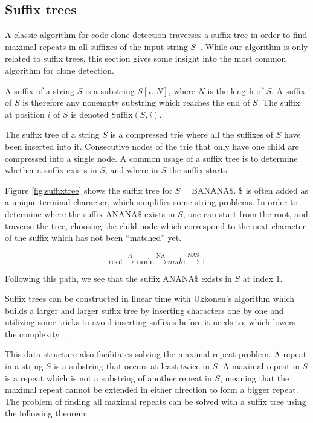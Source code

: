 \subsection*{Suffix trees}

A classic algorithm for code clone detection traverses a suffix tree in order to find
maximal repeats in all suffixes of the input string $S$~\cite{Zibran_real_time_search,
GodeIncrementalCloneDetection}. While our algorithm is only related to suffix trees, this
section gives some insight into the most common algorithm for clone detection.

A suffix of a string $S$ is a substring $S[i..N]$, where $N$ is the length of $S$. A
suffix of $S$ is therefore any nonempty substring which reaches the end of $S$. The suffix
at position $i$ of $S$ is denoted $\text{Suffix}(S, i)$.

The suffix tree of a string $S$ is a compressed trie where all the suffixes of $S$ have
been inserted into it. Consecutive nodes of the trie that only have one child are
compressed into a single node. A common usage of a suffix tree is to determine whether a
suffix exists in $S$, and where in $S$ the suffix starts.

Figure \ref{fig:suffixtree} shows the suffix tree for $S=\text{BANANA\$}$. \$ is often
added as a unique terminal character, which simplifies some string problems. In order to
determine where the suffix $\text{ANANA\$}$ exists in $S$, one can start from the root,
and traverse the tree, choosing the child node which correspond to the next character of
the suffix which has not been ``matched'' yet.

$$
\text{root} \xrightarrow{A} \text{node} \xrightarrow{\text{NA}} node \xrightarrow{\text{NA\$}} 1
$$

Following this path, we see that the suffix $\text{ANANA\$}$ exists in $S$ at index $1$.

Suffix trees can be constructed in linear time with Ukkonen's algorithm which builds a
larger and larger suffix tree by inserting characters one by one and utilizing some tricks
to avoid inserting suffixes before it needs to, which lowers the
complexity~\cite{Ukkonen}.

This data structure also facilitates solving the maximal repeat problem. A repeat in a
string $S$ is a substring that occurs at least twice in $S$. A maximal repeat in $S$ is a repeat
which is not a substring of another repeat in $S$, meaning that the maximal repeat cannot be
extended in either direction to form a bigger repeat. The problem of finding all maximal
repeats can be solved with a suffix tree using the following theorem:

